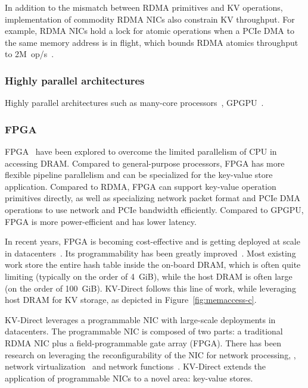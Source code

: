 {In addition to the mismatch between RDMA primitives and KV operations, implementation of commodity RDMA NICs also constrain KV throughput. For example, RDMA NICs hold a lock for atomic operations when a PCIe DMA to the same memory address is in flight, which bounds RDMA atomics throughput to \approx2M~op/s~\cite{kalia2016design}.

\subsubsection{Highly parallel architectures}

Highly parallel architectures such as many-core processors~\cite{berezecki2011many}, GPGPU~\cite{zhang2015mega}.

\subsubsection{FPGA}

FPGA~\cite{istvan2013flexible, chalamalasetti2013fpga, maohardware, lavasani2014fpga, istvan2015hash, istvan2016consensus, kvs-openpower, istvan2015hash, sidler2015scalable, blott2015scaling} have been explored to overcome the limited parallelism of CPU in accessing DRAM.
Compared to general-purpose processors, FPGA has more flexible pipeline parallelism and can be specialized for the key-value store application.
Compared to RDMA, FPGA can support key-value operation primitives directly, as well as specializing network packet format and PCIe DMA operations to use network and PCIe bandwidth efficiently.
Compared to GPGPU, FPGA is more power-efficient and has lower latency.

In recent years, FPGA is becoming cost-effective and is getting deployed at scale in datacenters~\cite{putnam2014programmable, caulfield2016cloud}. Its programmability has been greatly improved~\cite{li2016clicknp}.
Most existing work store the entire hash table inside the on-board DRAM, which is often quite limiting (typically on the order of 4~GiB), while the host DRAM is often large (on the order of 100~GiB).
KV-Direct follows this line of work, while leveraging host DRAM for KV storage, as depicted in Figure~\ref{fig:memaccess-c}.

KV-Direct leverages a programmable NIC with large-scale deployments in datacenters.
The programmable NIC is composed of two parts: a traditional RDMA NIC plus a field-programmable gate array (FPGA).
There has been research on leveraging the reconfigurability of the NIC for network processing, \eg, network virtualization~\cite{greenberg2015sdn, vfp} and network functions~\cite{li2016clicknp}.
KV-Direct extends the application of programmable NICs to a novel area: key-value stores.
}

